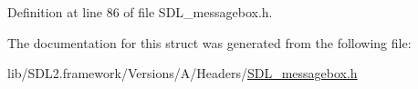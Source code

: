 Definition at line 86 of file S\+D\+L\+\_\+messagebox.\+h.



The documentation for this struct was generated from the following file\+:\begin{DoxyCompactItemize}
\item 
lib/\+S\+D\+L2.\+framework/\+Versions/\+A/\+Headers/\mbox{\hyperlink{_s_d_l__messagebox_8h}{S\+D\+L\+\_\+messagebox.\+h}}\end{DoxyCompactItemize}
